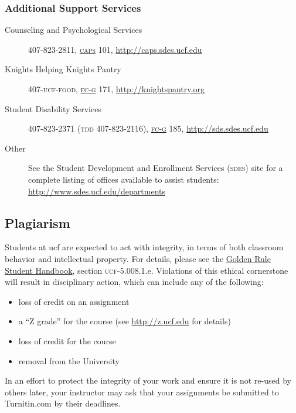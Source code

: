 \documentclass[11pt,oneside]{amsart}	%
\begin{document}
\subsubsection{Additional Support Services} %
\label{ssub:other_support_services}
\begin{description}
	\item [Counseling and Psychological Services] 407-823-2811, \href{http://map.ucf.edu/locations/27/counseling-center-caps/}{\textsc{caps}} 101, \href{http://caps.sdes.ucf.edu}{http://caps.sdes.ucf.edu}
	\item [Knights Helping Knights Pantry] 407-\textsc{ucf-food}, \href{http://map.ucf.edu/locations/7g/ferrell-commons-g-fc-g/}{\textsc{fc-g}} 171, \href{http://knightspantry.org}{http://knightspantry.org}
	\item [Student Disability Services] 407-823-2371 (\textsc{tdd} 407-823-2116), \href{http://map.ucf.edu/locations/7g/ferrell-commons-g-fc-g/}{\textsc{fc-g}} 185, \href{http://sds.sdes.ucf.edu}{http://sds.sdes.ucf.edu}
	\item [Other] See the Student Development and Enrollment Services (\textsc{sdes}) site for a complete listing of offices available to assist students:  \href{http://www.sdes.ucf.edu/departments}{http://www.sdes.ucf.edu/departments}
\end{description}


\subsection{Plagiarism}
Students at \ac{ucf} are expected to act with integrity, in terms of both classroom behavior and intellectual property.  For details, please see the \href{http://www.goldenrule.sdes.ucf.edu}{Golden Rule Student Handbook}, section \textsc{ucf}-5.008.1.e.  Violations of this ethical cornerstone will result in disciplinary action, which can include any of the following:
\begin{itemize}
	\item loss of credit on an assignment
	\item a ``Z grade'' for the course (see \href{http://z.ucf.edu}{http://z.ucf.edu} for details)
	\item loss of credit for the course
	\item removal from the University
\end{itemize}
In an effort to protect the integrity of your work and ensure it is not re-used by others later, your instructor may ask that your assignments be submitted to Turnitin.com by their deadlines.
\end{document}
